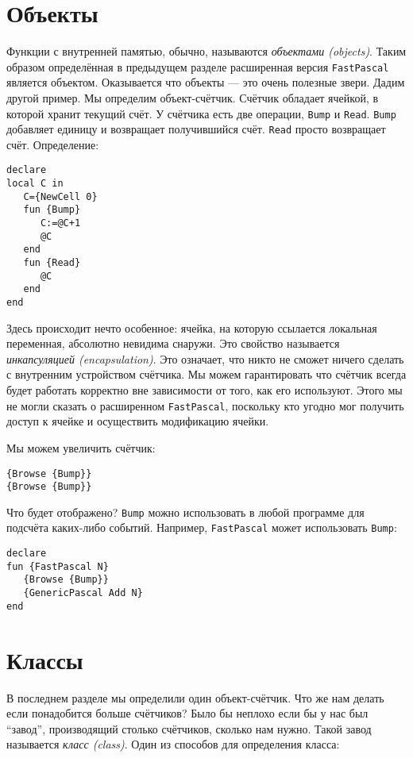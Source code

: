 \section{Объекты}\label{section:objects}

Функции с внутренней памятью, обычно, называются \emph{объектами (objects)}. Таким образом определённая в предыдущем разделе расширенная версия \lstinline|FastPascal| является объектом. Оказывается что объекты --- это очень полезные звери. Дадим другой пример. Мы определим объект-счётчик. Счётчик обладает ячейкой, в которой хранит текущий счёт. У счётчика есть две операции, \lstinline|Bump| и \lstinline|Read|. \lstinline|Bump| добавляет единицу и возвращает получившийся счёт. \lstinline|Read| просто возвращает счёт. Определение:

\begin{lstlisting}
declare
local C in
   C={NewCell 0}
   fun {Bump}
      C:=@C+1
      @C
   end
   fun {Read}
      @C
   end
end
\end{lstlisting}

Здесь происходит нечто особенное: ячейка, на которую ссылается локальная переменная, абсолютно невидима снаружи. Это свойство называется \emph{инкапсуляцией (encapsulation)}. Это означает, что никто не сможет ничего сделать с внутренним устройством счётчика. Мы можем гарантировать что счётчик всегда будет работать корректно вне зависимости от того, как его используют. Этого мы не могли сказать о расширенном \lstinline|FastPascal|, поскольку кто угодно мог получить доступ к ячейке и осуществить модификацию ячейки.

Мы можем увеличить счётчик:

\begin{lstlisting}
{Browse {Bump}}
{Browse {Bump}}
\end{lstlisting}

Что будет отображено? \lstinline|Bump| можно использовать в любой программе для подсчёта каких-либо событий. Например, \lstinline|FastPascal| может использовать \lstinline|Bump|:

\begin{lstlisting}
declare
fun {FastPascal N}
   {Browse {Bump}}
   {GenericPascal Add N}
end
\end{lstlisting}

\section{Классы}

В последнем разделе мы определили один объект-счётчик. Что же нам делать если понадобится больше счётчиков? Было бы неплохо если бы у нас был ``завод'', производящий столько счётчиков, сколько нам нужно. Такой завод называется \emph{класс (class)}. Один из способов для определения класса:

